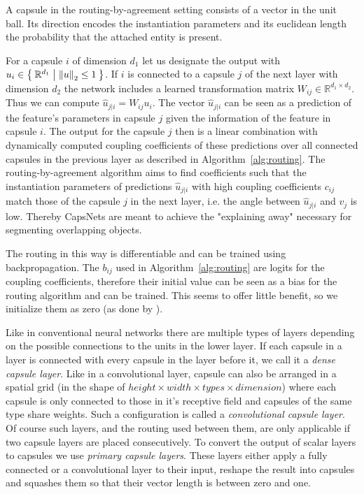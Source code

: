 \newcommand{\uhat}{\hat{u}_{j \vert i}}

A capsule in the routing-by-agreement setting consists of a vector in the unit ball.
Its direction encodes the instantiation parameters and its euclidean length the probability that the attached entity is present.

For a capsule $i$ of dimension $d_1$ let us designate the output with $u_i \in \Set{ \mathbb{R}^{d_1} | \left \lVert u \right \rVert _{2} \leq 1}$.
If $i$ is connected to a capsule $j$ of the next layer with dimension $d_2$ the network includes a learned transformation matrix $W_{ij} \in \mathbb{R}^{d_1 \times d_2}$.
Thus we can compute $\uhat = W_{ij} u_i$.
The vector $\uhat$ can be seen as a prediction of the feature's parameters in capsule $j$ given the information of the feature in capsule $i$.
The output for the capsule $j$ then is a linear combination with dynamically computed coupling coefficients of these predictions over all connected capsules in the previous layer as described in Algorithm~\ref{alg:routing}.
The routing-by-agreement algorithm aims to find coefficients such that the instantiation parameters of predictions $\uhat$ with high coupling coefficients $c_{ij}$ match those of the capsule $j$ in the next layer, i.e. the angle between $\uhat$ and $v_j$ is low.
Thereby CapsNets are meant to achieve the "explaining away" necessary for segmenting overlapping objects.

The routing in this way is differentiable and can be trained using backpropagation.
The $b_{ij}$ used in Algorithm~\ref{alg:routing} are logits for the coupling coefficients, therefore their initial value can be seen as a bias for the routing algorithm and can be trained.
This seems to offer little benefit, so we initialize them as zero (as done by \cite{capsules}).

Like in conventional neural networks there are multiple types of layers depending on the possible connections to the units in the lower layer.
If each capsule in a layer is connected with every capsule in the layer before it, we call it a \emph{dense capsule layer}.
Like in a convolutional layer, capsule can also be arranged in a spatial grid (in the shape of $height \times width \times types \times dimension$) where each capsule is only connected to those in it's receptive field and capsules of the same type share weights.
Such a configuration is called a \emph{convolutional capsule layer}.
Of course such layers, and the routing used between them, are only applicable if two capsule layers are placed consecutively.
To convert the output of scalar layers to capsules we use \emph{primary capsule layers}.
These layers either apply a fully connected or a convolutional layer to their input, reshape the result into capsules and squashes them so that their vector length is between zero and one.

